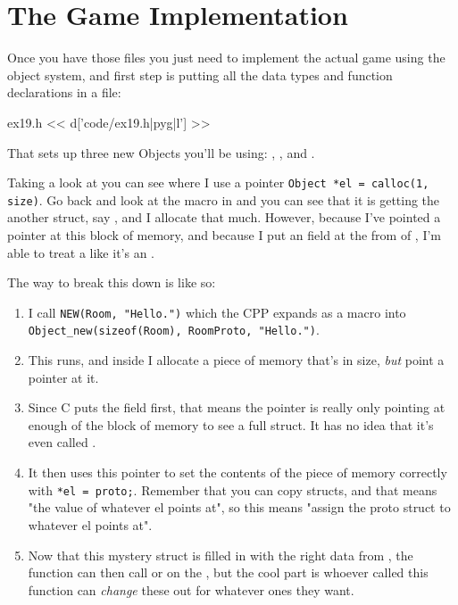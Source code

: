 \section{The Game Implementation}

Once you have those files you just need to implement the actual game
using the object system, and first step is putting all the data types
and function declarations in a  file:

\begin{code}{ex19.h}
<< d['code/ex19.h|pyg|l'] >>
\end{code}

That sets up three new Objects you'll be using: , ,
and .

Taking a look at  you can see where I use a pointer
\verb|Object *el = calloc(1, size)|.  Go back and look at the 
macro in  and you can see that it is getting the 
another struct, say , and I allocate that much.  However, because
I've pointed a  pointer at this block of memory, and because
I put an  field at the from of , I'm able
to treat a  like it's an .

The way to break this down is like so:

\begin{enumerate}
\item I call \verb|NEW(Room, "Hello.")| which the CPP expands as a macro
    into \verb|Object_new(sizeof(Room), RoomProto, "Hello.")|.
\item This runs, and inside  I allocate a piece of memory
    that's  in size, \emph{but} point a  pointer
    at it.
\item Since C puts the  field first, that means the 
    pointer is really only pointing at enough of the block of memory to
    see a full  struct.  It has no idea that it's even called
    .
\item It then uses this  pointer to set the contents of
    the piece of memory correctly with \verb|*el = proto;|.  Remember that
    you can copy structs, and that  means "the value of whatever el points
    at", so this means "assign the proto struct to whatever el points at".
\item Now that this mystery struct is filled in with the right data from
    , the function can then call  or 
    on the , but the cool part is whoever called this function
    can \emph{change} these out for whatever ones they want.
\end{enumerate}

